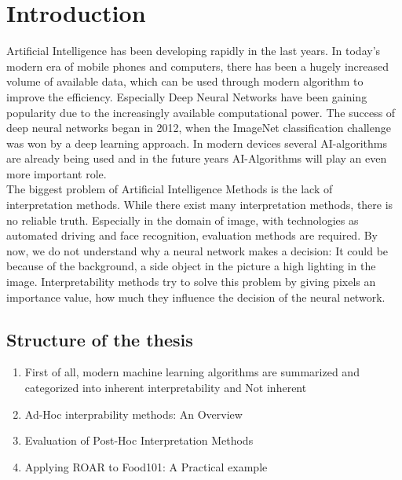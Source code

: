 
\chapter{Introduction}

Artificial Intelligence has been developing rapidly in the last years. In today's modern era of mobile phones and computers, there has been a hugely increased volume of available data, which can be used through modern algorithm to improve the efficiency. Especially Deep Neural Networks have been gaining popularity due to the increasingly available computational power. The success of deep neural networks began in 2012, when the ImageNet classification challenge was won by a deep learning approach. In modern devices several AI-algorithms are already being used and in the future years AI-Algorithms will play an even more important role.
\\

The biggest problem of Artificial Intelligence Methods is the lack of interpretation methods. While there exist many interpretation methods, there is no reliable truth. Especially in the domain of image, with technologies as automated driving and face recognition, evaluation methods are required. By now, we do not understand why a neural network makes a decision: It could be because of the background, a side object in the picture a high lighting in the image. Interpretability methods try to solve this problem by giving pixels an importance value, how much they influence the decision of the neural network.
\\





\section{Structure of the thesis}

\begin{enumerate}
	\item First of all, modern machine learning algorithms are summarized and categorized into inherent interpretability and Not inherent
\item Ad-Hoc interprability  methods: An Overview
\item Evaluation of Post-Hoc Interpretation Methods
\item Applying ROAR to Food101: A Practical example
\end{enumerate}



